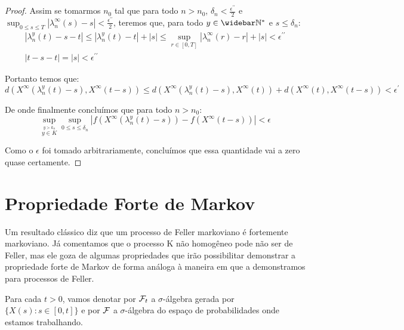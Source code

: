 \begin{proof}
  Assim se tomarmos $n_0$ tal que para todo $n > n_0$, $\delta_{n} <
  \frac{\epsilon^{\prime\prime}}{2}$ e $\sup_{0 \leq s \leq T}
  |\lambda_n^\infty(s) - s| < \frac{\epsilon^{\prime\prime}}{2}$, teremos
  que, para todo $y\in\Nzb$ e $s \leq \delta_n$:
  \begin{gather*}
    |\lambda_n^y(t) - s - t| \leq 
     |\lambda_n^y(t) - t | + |s| \leq
     \sup_{r \in [0, T]} |\lambda_n^\infty(r) - r | + |s|
     < \epsilon^{\prime\prime}\\
    |t - s - t |  = |s| < \epsilon^{\prime\prime}
  \end{gather*}
  
  Portanto temos que:
  \begin{displaymath}
    d(X^\infty(\lambda_n^y(t)-s), X^\infty(t-s)) \leq
     d(X^\infty(\lambda_n^y(t)-s), X^\infty(t))+
     d(X^\infty(t), X^\infty(t-s))
     < \epsilon^{\prime}
  \end{displaymath}

  De onde finalmente concluímos que para todo $n > n_0$:
  \begin{displaymath} 
    \sup_{\stackrel{y > k_n}{y \in K}}
    \sup_{0 \leq s \leq \delta_n} \left\lvert
      f(X^\infty(\lambda_n^y(t)-s)) -
      f(X^\infty(t-s))
    \right\rvert < \epsilon
  \end{displaymath}

  Como o $\epsilon$ foi tomado arbitrariamente, concluímos que essa
  quantidade vai a zero quase certamente.
\end{proof}


\section{Propriedade Forte de Markov}
\label{sec:prop-forte-markov}

Um resultado clássico diz que um processo de Feller markoviano é
fortemente markoviano. Já comentamos que o processo K não homogêneo
pode não ser de Feller, mas ele goza de algumas propriedades que irão
possibilitar demonstrar a propriedade forte de Markov de forma análoga
à maneira em que a demonstramos para processos de Feller.

Para cada $t > 0$, vamos denotar por ${\mathcal{F}}_t$ a $\sigma$-álgebra gerada
por $\{X(s): s \in [0, t]\}$ e por ${\mathcal{F}}$ a $\sigma$-álgebra do espaço
de probabilidades onde estamos trabalhando.


